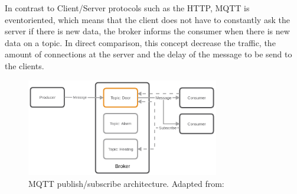 In contrast to Client/Server protocols such as the \acs{HTTP}, \ac{MQTT} is eventoriented, which means that the client does not have to constantly ask the server if there is new data, the broker informs the consumer when there is new data on a topic.\autocite[cf.]{Bayer:MQTT}
In direct comparison, this concept decrease the traffic, the amount of connections at the server and the delay of the message to be send to the clients.

\begin{figure}[H]
    \centering
    \includegraphics[width=0.75\textwidth]{resources/images/mqtt_architecture.png}
    \caption[MQTT publish/subscribe architecture]{MQTT publish/subscribe architecture. Adapted from: \autocite{Bayer:MQTT}}
    \label{fig:mqtt_architecture}
\end{figure}

